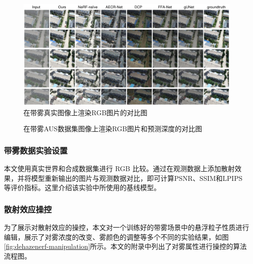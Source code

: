 \begin{figure}[ht]
    \centering
    \includegraphics[width=\textwidth]{undergraduate-thesis/images/experiments/exp-appearance-export.pdf}
    \caption{在带雾真实图像上渲染RGB图片的对比图}
    \label{fig:dehazenerf-real-rgb}
\end{figure}

\begin{figure}[p]
    \centering
    \caption{在带雾AUS数据集图像上渲染RGB图片和预测深度的对比图}
    \label{fig:dehazenerf-synt-rgbd}
\end{figure}



\subsubsection{带雾数据实验设置}
本文使用真实世界和合成数据集进行 RGB 比较。通过在观测数据上添加散射效果，并将模型重新输出的图片与观测数据对比，即可计算PSNR、SSIM和LPIPS等评价指标。这里介绍该实验中所使用的基线模型。

\subsubsection{散射效应操控}
为了展示对散射效应的操控，本文对一个训练好的带雾场景中的悬浮粒子性质进行编辑，展示了对雾浓度的改变、雾颜色的调整等多个不同的实验结果，如图\ref{fig:dehazenerf-manipulation}所示。本文的附录中列出了对雾属性进行操控的算法流程图。

